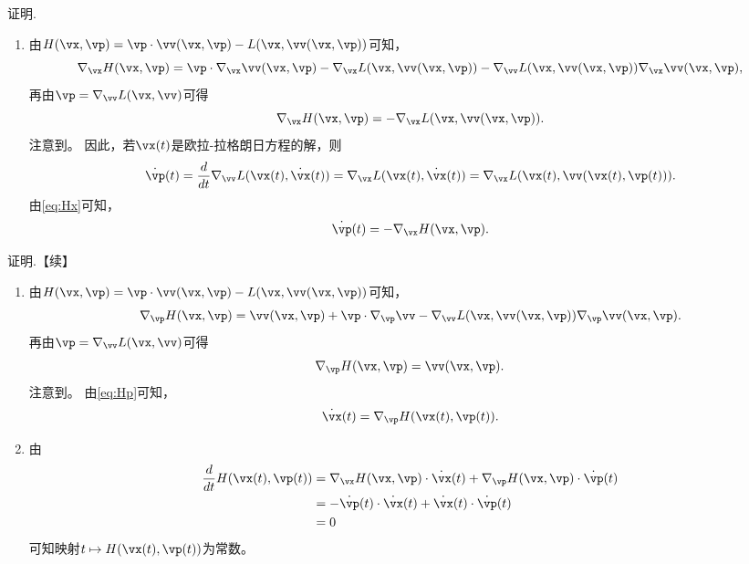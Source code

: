 \begin{frame}{\subsecname}
\begin{block}{证明.}
\begin{enumerate}
    \item 由$H(\vx,\vp)=\vp\cdot\vv(\vx,\vp)-L(\vx,\vv(\vx,\vp))$可知，
    $$
    \nabla_\vx H(\vx,\vp) = \vp\cdot \nabla_\vx \vv(\vx,\vp) - \nabla_\vx L(\vx,\vv(\vx,\vp)) - \nabla_\vv L(\vx,\vv(\vx,\vp)) \nabla_\vx \vv(\vx,\vp),
    $$
    再由$\vp=\nabla_\vv L(\vx,\vv)$可得
    \begin{equation}\label{eq:Hx}
        \nabla_\vx H(\vx,\vp) = -  \nabla_\vx L(\vx,\vv(\vx,\vp)) .
    \end{equation}
    注意到。
    因此，若$\vx(t)$是欧拉-拉格朗日方程的解，则
    $$
    \dot\vp(t) = \frac{d}{dt}\nabla_\vv L(\vx(t),\dot\vx(t)) 
    = \nabla_\vx  L(\vx(t),\dot\vx(t)) 
    = \nabla_\vx  L(\vx(t),\vv(\vx(t),\vp(t))).
    $$
    由\eqref{eq:Hx}可知，
    $$
    \dot\vp(t) = - \nabla_\vx H(\vx,\vp).
    $$
\end{enumerate}
\end{block}
\end{frame}

\begin{frame}{\subsecname}
\begin{block}{证明.【续】}
\begin{enumerate}[2]
    \item 由$H(\vx,\vp)=\vp\cdot\vv(\vx,\vp)-L(\vx,\vv(\vx,\vp))$可知，
    $$
    \nabla_\vp H(\vx,\vp) = \vv(\vx,\vp) + \vp \cdot \nabla_\vp \vv - \nabla_\vv L(\vx,\vv(\vx,\vp)) \nabla_\vp \vv(\vx,\vp).
    $$
    再由$\vp=\nabla_\vv L(\vx,\vv)$可得
    \begin{equation}\label{eq:Hp}
        \nabla_\vp H(\vx,\vp) = \vv(\vx,\vp).
    \end{equation}
    注意到。
    由\eqref{eq:Hp}可知，
    $$
    \dot\vx(t) = \nabla_\vp H(\vx(t),\vp(t)).
    $$
    \pause 
    \item 由
    $$
    \begin{aligned}
    \frac{d}{dt} H(\vx(t),\vp(t)) &= \nabla_\vx H(\vx,\vp) \cdot \dot\vx(t)+\nabla_\vp H(\vx,\vp) \cdot \dot\vp(t)\\
    &= -\dot\vp(t) \cdot \dot\vx(t)+\dot\vx(t) \cdot \dot\vp(t)\\
    & = 0
    \end{aligned}
    $$
    可知映射$t \mapsto H(\vx(t), \vp(t))$为常数。
\end{enumerate}
\end{block}
\end{frame}

